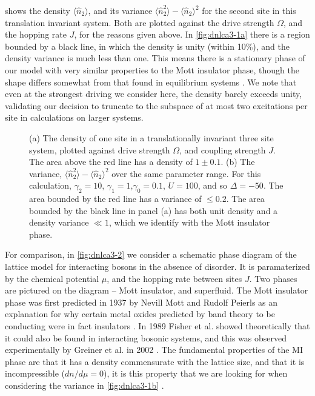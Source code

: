  shows the density \(\langle \hat{n}_{2} \rangle\), and its variance \(\langle \hat{n}_{2}^{2} \rangle - \langle \hat{n}_{2} \rangle^{2}\) for the second site in this translation invariant system. Both are plotted against the drive strength \(\Omega\), and the hopping rate \(J\), for the reasons given above. In \cref{fig:dnlca3-1a} there is a region bounded by a black line, in which the density is unity (within 10\%), and the density variance is much less than one. This means there is a stationary phase of our model with very similar properties to the Mott insulator phase, though the shape differs somewhat from that found in equilibrium systems \cite{Rossini2007}. We note that even at the strongest driving we consider here, the density barely exceeds unity, validating our decision to truncate to the subspace of at most two excitations per site in calculations on larger systems.

\begin{figure}[ht]
	 \hfill
	\caption{\label{fig:dnlca3-1} (a) The density of one site in a translationally invariant three site system, plotted against drive strength \(\Omega\), and coupling strength \(J\). The area above the red line has a density of \(1 \pm 0.1\). (b) The variance, \(\langle \hat{n}_{2}^{2} \rangle - \langle \hat{n}_{2} \rangle^{2}\) over the same parameter range. For this calculation, \(\gamma_{2} = 10\), \(\gamma_{1} = 1\),\(\gamma_{0} = 0.1\), \(U=100\), and so \(\Delta = -50\). The area bounded by the red line has a variance of \(\leq 0.2\). The area bounded by the black line in panel (a) has both unit density and a density variance \(\ll 1\), which we identify with the Mott insulator phase.}
\end{figure}

For comparison, in \cref{fig:dnlca3-2} we consider a schematic phase diagram of the lattice model for interacting bosons in the absence of disorder. It is paramaterized by the chemical potential \(\mu\), and the hopping rate between sites \(J\). Two phases are pictured on the diagram -- Mott insulator, and superfluid. The Mott insulator phase was first predicted in 1937 by Nevill Mott and Rudolf Peierls as an explanation for why certain metal oxides predicted by band theory to be conducting were in fact insulators \cite{Mott1937,DeBoer1937}. In 1989 Fisher et al. showed theoretically that it could also be found in interacting bosonic systems, and this was observed experimentally by Greiner et al. in 2002 \cite{Fisher1989,Greiner2002}. The fundamental properties of the MI phase are that it has a density commensurate with the lattice size, and that it is incompressible (\(dn/d\mu = 0\)), it is this property that we are looking for when considering the variance in \cref{fig:dnlca3-1b} \cite{Bloch2008}. 

